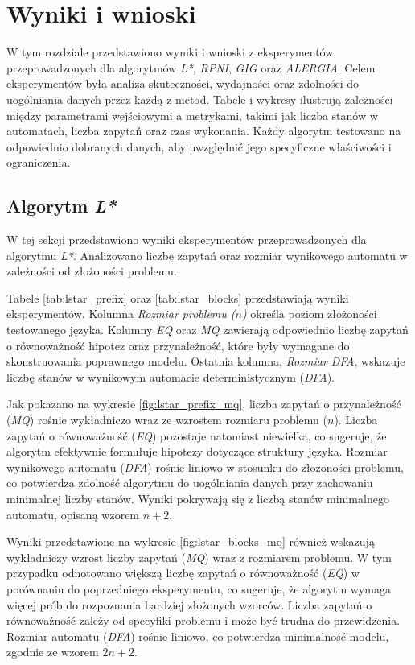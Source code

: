 \chapter{Wyniki i wnioski}  
\label{cha:wyniki}  

W tym rozdziale przedstawiono wyniki i wnioski z eksperymentów przeprowadzonych dla algorytmów \textit{L*}, \textit{RPNI}, \textit{GIG} oraz \textit{ALERGIA}. Celem eksperymentów była analiza skuteczności, wydajności oraz zdolności do uogólniania danych przez każdą z metod. Tabele i wykresy ilustrują zależności między parametrami wejściowymi a metrykami, takimi jak liczba stanów w automatach, liczba zapytań oraz czas wykonania. Każdy algorytm testowano na odpowiednio dobranych danych, aby uwzględnić jego specyficzne właściwości i ograniczenia.


\section{Algorytm \textit{L*}}  
W tej sekcji przedstawiono wyniki eksperymentów przeprowadzonych dla algorytmu \textit{L*}. Analizowano liczbę zapytań oraz rozmiar wynikowego automatu w zależności od złożoności problemu. 

Tabele \ref{tab:lstar_prefix} oraz \ref{tab:lstar_blocks} przedstawiają wyniki eksperymentów. Kolumna \textit{Rozmiar problemu (\(n\))} określa poziom złożoności testowanego języka. Kolumny \textit{EQ} oraz \textit{MQ} zawierają odpowiednio liczbę zapytań o równoważność hipotez oraz przynależność, które były wymagane do skonstruowania poprawnego modelu. Ostatnia kolumna, \textit{Rozmiar DFA}, wskazuje liczbę stanów w wynikowym automacie deterministycznym (\textit{DFA}).

Jak pokazano na wykresie \ref{fig:lstar_prefix_mq}, liczba zapytań o przynależność (\textit{MQ}) rośnie wykładniczo wraz ze wzrostem rozmiaru problemu (\(n\)). Liczba zapytań o równoważność (\textit{EQ}) pozostaje natomiast niewielka, co sugeruje, że algorytm efektywnie formułuje hipotezy dotyczące struktury języka. Rozmiar wynikowego automatu (\textit{DFA}) rośnie liniowo w stosunku do złożoności problemu, co potwierdza zdolność algorytmu do uogólniania danych przy zachowaniu minimalnej liczby stanów. Wyniki pokrywają się z liczbą stanów minimalnego automatu, opisaną wzorem \( n + 2 \).

Wyniki przedstawione na wykresie \ref{fig:lstar_blocks_mq} również wskazują wykładniczy wzrost liczby zapytań (\textit{MQ}) wraz z rozmiarem problemu. W tym przypadku odnotowano większą liczbę zapytań o równoważność (\textit{EQ}) w porównaniu do poprzedniego eksperymentu, co sugeruje, że algorytm wymaga więcej prób do rozpoznania bardziej złożonych wzorców. Liczba zapytań o równoważność zależy od specyfiki problemu i może być trudna do przewidzenia. Rozmiar automatu (\textit{DFA}) rośnie liniowo, co potwierdza minimalność modelu, zgodnie ze wzorem \( 2n + 2 \).

